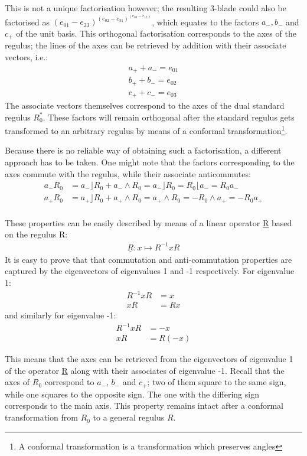 \documentclass[a4paper, 10pt]{article}
\begin{document}
This is not a unique factorisation however; the resulting 3-blade could also be
factorised as $(e_{01} - e_{23}) ^ (e_{02} - e_{31}) ^ (e_{03} - e_{12})$, which
equates to the factors $a_-, b_-$ and $c_+$ of the unit basis. This
orthogonal factorisation corresponds to the axes of the regulus; the lines of
the axes can be retrieved by addition with their associate vectors, i.e.:
\begin{align*}
  a_+ + a_- = e_{01} \\
  b_+ + b_- = e_{02} \\
  c_+ + c_- = e_{03}
\end{align*}
The associate vectors themselves correspond to the axes of the dual standard
regulus $R_{0}^*$. These factors will remain orthogonal after the standard
regulus gets transformed to an arbitrary regulus by means of a conformal
transformation\footnote{A conformal transformation is a transformation which
  preserves angles}.

Because there is no reliable way of obtaining such a factorisation, a different
approach has to be taken. One might note that the factors corresponding to the
axes commute with the regulus, while their associate anticommutes:
\begin{align*}
  a_- R_0 &= a_- \rfloor R_0 + a_- \wedge R_0 = a_- \rfloor R_0 =  R_0 \lfloor a_- = R_0 a_- \\
  a_+ R_0 &= a_+ \rfloor R_0 + a_+ \wedge R_0 = a_+ \wedge R_0 = -R_0 \wedge a_+ = -R_0 a_+ \\
\end{align*}

These properties can be easily described by means of a linear operator
\underline{R} based on the regulus R\cite{dorst2013versors}:
\begin{align*}
  \underline{R} : x \mapsto R^{-1} x R
\end{align*}
It is easy to prove that that commutation and anti-commutation properties are
captured by the eigenvectors of eigenvalues 1 and -1 respectively.
For eigenvalue 1:
\begin{align*}
  R^{-1} x R &= x \\
  x R &= R x
\end{align*}
and similarly for eigenvalue -1:
\begin{align*}
  R^{-1} x R &= -x \\
  x R &= R (-x)
\end{align*}

This means that the axes can be retrieved from the eigenvectors of eigenvalue 1 of
the operator \underline{R} along with their associates of eigenvalue -1. Recall
that the axes of $R_0$ correspond to $a_-$, $b_-$ and $c_+$; two of them square
to the same sign, while one squares to the opposite sign. The one with the
differing sign corresponds to the main axis. This property remains intact
after a conformal transformation from $R_0$ to a general regulus $R$.
\end{document}
